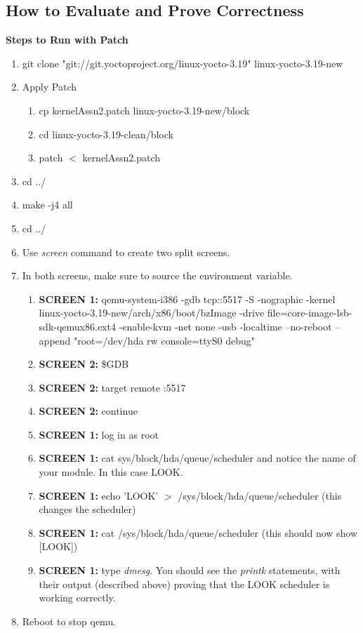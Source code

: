 \documentclass[draftclsnofoot, onecolumn, 10pt, compsoc]{IEEEtran}
\begin{document}
		\subsection{How to Evaluate and Prove Correctness}
			\textbf{Steps to Run with Patch}
			\begin{enumerate}
				\item git clone "git://git.yoctoproject.org/linux-yocto-3.19" linux-yocto-3.19-new
				\item Apply Patch
				\begin{enumerate}
					\item cp kernelAssn2.patch linux-yocto-3.19-new/block
					\item cd linux-yocto-3.19-clean/block
					\item patch $<$ kernelAssn2.patch
				\end{enumerate}
				\item cd ../
				\item make -j4 all
				\item cd ../
				\item Use \textit{screen} command to create two split screens.
				\item In both screens, make sure to source the environment variable.
				\begin{enumerate}
					\item \textbf{SCREEN 1:}
					qemu-system-i386 -gdb tcp::5517 -S -nographic -kernel linux-yocto-3.19-new/arch/x86/boot/bzImage -drive file=core-image-lsb-sdk-qemux86.ext4 -enable-kvm -net none -usb -localtime --no-reboot --append "root=/dev/hda rw console=ttyS0 debug"
					\item \textbf{SCREEN 2:} \$GDB
					\item \textbf{SCREEN 2:} target remote :5517
					\item \textbf{SCREEN 2:} continue
					\item \textbf{SCREEN 1:} log in as root
					\item \textbf{SCREEN 1:} cat sys/block/hda/queue/scheduler and notice the name of your module. In this case LOOK.
					\item \textbf{SCREEN 1:} echo 'LOOK' $>$ /sys/block/hda/queue/scheduler (this changes the scheduler)
					\item \textbf{SCREEN 1:} cat /sys/block/hda/queue/scheduler (this should now show [LOOK])
					\item \textbf{SCREEN 1:} type \textit{dmesg}. You should see the \textit{printk} statements, with their output (described above) proving that the LOOK scheduler is working correctly.
				\end{enumerate}
				\item Reboot to stop qemu.
			\end{enumerate}
\end{document}
